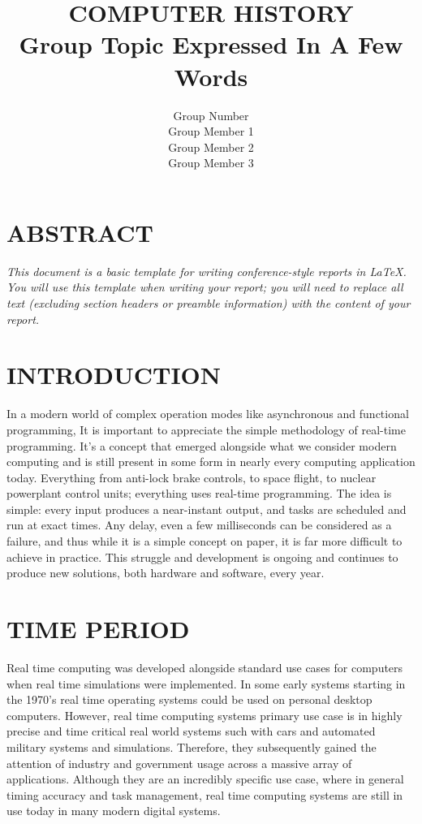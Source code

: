 \documentclass[letterpaper, 10 pt, conference]{IEEEconf}
\title{\LARGE \bf
COMPUTER HISTORY\\
\large Group Topic Expressed In A Few Words
}
\author{Group Number\\
\small Group Member 1\\
\small Group Member 2\\
\small Group Member 3\\
}
\begin{document}
\maketitle
\thispagestyle{empty}
\pagestyle{empty}


\section*{ABSTRACT}
\textit{
This document is a basic template for writing conference-style
reports in LaTeX. You will use this template when writing
your report; you will need to replace all text (excluding
section headers or preamble information) with the content
of your report.
}

\section{INTRODUCTION}

In a modern world of complex operation modes like asynchronous and functional programming, 
It is important to appreciate the simple methodology of real-time programming. It's a concept 
that emerged alongside what we consider modern computing and is still present in some form in nearly 
every computing application today. Everything from anti-lock brake controls, to space flight, to nuclear powerplant control units; 
everything uses real-time programming. The idea is simple: every input produces a near-instant output, and tasks are scheduled and 
run at exact times. Any delay, even a few milliseconds can be considered as a failure, and thus while it is a simple concept on paper, 
it is far more difficult to achieve in practice. This struggle and development is ongoing and continues to produce new solutions, both hardware and 
software, every year.

\section{TIME PERIOD}

Real time computing was developed alongside standard use cases for computers when real time simulations were implemented. In 
some early systems starting in the 1970's real time operating systems could be used on personal desktop computers. However, 
real time computing systems primary use case is in highly precise and time critical real world systems such with cars and 
automated military systems and simulations. Therefore, they subsequently gained the attention of industry and government 
usage across a massive array of applications. Although they are an incredibly specific use case, where in general timing 
accuracy and task management, real time computing systems are still in use today in many modern digital systems.
\end{document}
